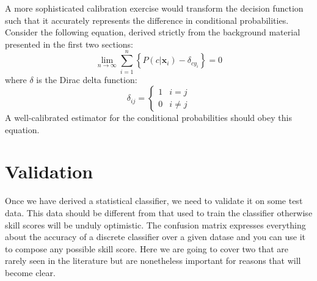 \documentclass{article}
\renewcommand{\vec}[1]{\boldsymbol{#1}}
\begin{document}
A more sophisticated calibration exercise would transform the decision
function such that it accurately represents the difference in conditional
probabilities.
Consider the following equation, derived strictly from the background material
presented in the first two sections:
\begin{equation}
\lim_{n \rightarrow \infty} \sum_{i=1}^n \left \lbrace P(c | \vec x_i) - \delta_{c y_i} \right \rbrace = 0
\label{full_cal}
\end{equation}
where $\delta$ is the Dirac delta function:
\begin{equation}
	\delta_{ij} = \left \lbrace \begin{array}{rl}
		1 & i = j \\
		0 & i \ne j
	\end{array} \right .
\end{equation}
A well-calibrated estimator for the conditional probabilities should obey this
equation.

\section{Validation}

Once we have derived a statistical classifier, we need to validate it on
some test data.
This data should be different from that used to train the classifier otherwise
skill scores will be unduly optimistic.
The confusion matrix expresses everything about 
the accuracy of a discrete classifier over a given datase and you can use it
to compose any possible skill score.
Here we are going to cover two that are rarely seen in the literature but are
nonetheless important for reasons that will become clear.
\end{document}

